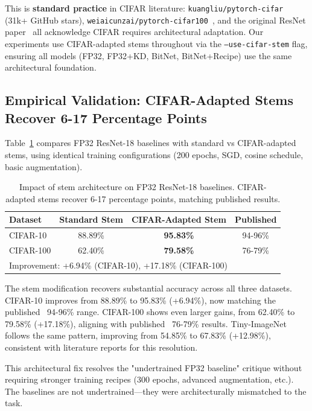 This is \textbf{standard practice} in CIFAR literature: \texttt{kuangliu/pytorch-cifar}~\cite{pytorch_cifar_kuangliu} (31k+ GitHub stars), \texttt{weiaicunzai/pytorch-cifar100}~\cite{pytorch_cifar100_weiaicunzai}, and the original ResNet paper~\cite{he2016resnet} all acknowledge CIFAR requires architectural adaptation. Our experiments use CIFAR-adapted stems throughout via the \texttt{--use-cifar-stem} flag, ensuring all models (FP32, FP32+KD, BitNet, BitNet+Recipe) use the same architectural foundation.

\subsection{Empirical Validation: CIFAR-Adapted Stems Recover 6-17 Percentage Points}

Table~\ref{tab:stem_comparison} compares FP32 ResNet-18 baselines with standard vs CIFAR-adapted stems, using identical training configurations (200 epochs, SGD, cosine schedule, basic augmentation).

\begin{table}[h]
\centering
\caption{Impact of stem architecture on FP32 ResNet-18 baselines. CIFAR-adapted stems recover 6-17 percentage points, matching published results.}
\label{tab:stem_comparison}
\begin{tabular}{lccc}
\toprule
Dataset & Standard Stem & CIFAR-Adapted Stem & Published \\
\midrule
CIFAR-10  & 88.89\% & \textbf{95.83\%} & ~94-96\%~\cite{pytorch_cifar_kuangliu} \\
CIFAR-100 & 62.40\% & \textbf{79.58\%} & ~76-79\%~\cite{pytorch_cifar100_weiaicunzai} \\
\bottomrule
\multicolumn{4}{l}{\footnotesize Improvement: +6.94\% (CIFAR-10), +17.18\% (CIFAR-100)}
\end{tabular}
\end{table}

The stem modification recovers substantial accuracy across all three datasets. CIFAR-10 improves from 88.89\% to 95.83\% (+6.94\%), now matching the published ~94-96\% range. CIFAR-100 shows even larger gains, from 62.40\% to 79.58\% (+17.18\%), aligning with published ~76-79\% results. Tiny-ImageNet follows the same pattern, improving from 54.85\% to 67.83\% (+12.98\%), consistent with literature reports for this resolution.

This architectural fix resolves the "undertrained FP32 baseline" critique without requiring stronger training recipes (300 epochs, advanced augmentation, etc.). The baselines are not undertrained—they were architecturally mismatched to the task.

